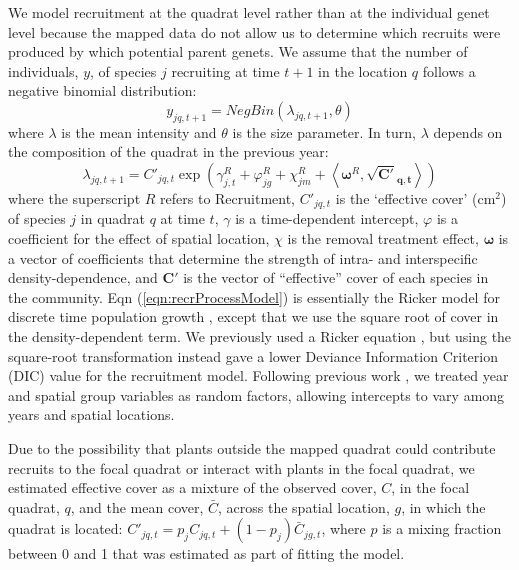 \documentclass[11pt]{article}
\begin{document}
\begin{doublespacing}
We model recruitment at the quadrat level rather than at the individual genet level because the mapped data do not allow us to determine which recruits were produced by which potential parent genets. We assume that the number of individuals, $y$, of species $j$ recruiting at time $t+1$ in the location $q$ follows a negative binomial distribution:
\begin{equation}
y_{jq,t+1}= NegBin(\lambda_{jq,t+1},\theta) 	   
\label{eqn:recrDataModel}
\end{equation}
where $\lambda$ is the mean intensity and $\theta$ is the size parameter. In turn, $\lambda$ depends on the composition of the quadrat in the previous year:
\begin{equation}
\lambda_{jq,t+1} = C'_{jq,t} \exp{\left(\gamma_{j,t}^R +  \varphi_{jg}^R + \chi_{jm}^R + 
\left \langle \boldsymbol{\omega}^R , \boldsymbol{\sqrt{C'}_{q,t}} \right \rangle \right) }
\label{eqn:recrProcessModel}
\end{equation}
where the superscript $R$ refers to Recruitment, $C'_{jq,t}$ is the `effective cover' (cm$^2$) of species $j$ in quadrat $q$ at time $t$, $\gamma$ is a time-dependent intercept, $\varphi$ is a coefficient for the effect of spatial location,
$\chi$ is the removal treatment effect, $\boldsymbol{\omega}$ is a vector of coefficients that determine the strength of intra- and interspecific density-dependence, and $\boldsymbol{C'}$ is the vector of ``effective'' cover of each species in the community. Eqn (\ref{eqn:recrProcessModel}) is essentially the Ricker model for discrete time population growth \citep{ricker_stock_1954}, except that we use the square root of cover in the density-dependent term. We previously used a Ricker equation \citep{adler_coexistence_2010}, but using the square-root transformation instead gave a lower Deviance Information Criterion (DIC) value \citep{spiegelhalter_bayesian_2002} for the recruitment model. Following previous work \citep{adler_coexistence_2010}, we treated year and spatial group variables as random factors, allowing intercepts to vary among years and spatial locations. 

Due to the possibility that plants outside the mapped quadrat could contribute recruits to the focal quadrat or interact with plants in the focal quadrat, we estimated effective cover as a mixture of the observed cover, $C$, in the focal quadrat, $q$, and the mean cover, $\bar{C}$, across the spatial location, $g$, in which the quadrat is located: $C'_{jq,t}=p_j C_{jq,t}+(1-p_j) \bar{C}_{jg,t}$, where $p$ is a mixing fraction between 0 and 1 that was estimated as part of fitting the model.


\end{doublespacing}
\end{document}
